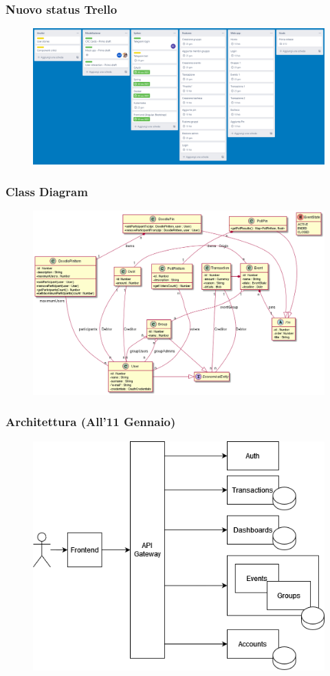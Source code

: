 \documentclass[11pt]{beamer}
\begin{document}
	\begin{frame}
		\frametitle{Nuovo status Trello}
		\begin{figure}
			\centering
			\includegraphics[width=\linewidth]{img/trello2}
		\end{figure}
	\end{frame}

	\begin{frame}
		\frametitle{Class Diagram}
		\begin{figure}
			\centering
			\includegraphics[width=\linewidth]{out/class_diagram/Class Diagram}
		\end{figure}
	\end{frame}	
	
	\begin{frame}
		\frametitle{Architettura (All'11 Gennaio)}
		\begin{figure}
			\centering
			\includegraphics[width=0.8\linewidth]{img/Architecture Draft}
		\end{figure}
	\end{frame}
\end{document}
